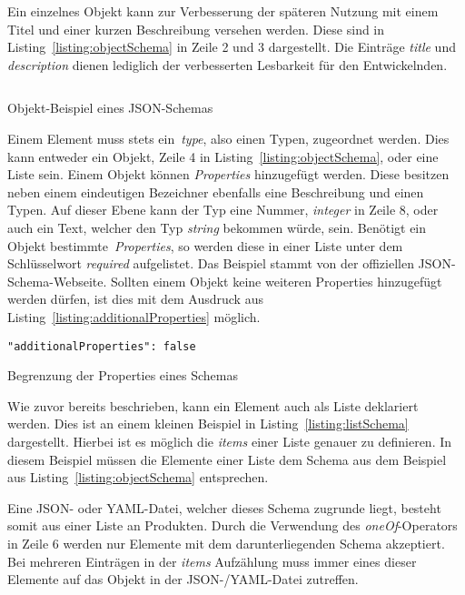 Ein einzelnes Objekt kann zur Verbesserung der späteren Nutzung mit einem Titel und einer kurzen Beschreibung versehen werden.
Diese sind in Listing~\ref{listing:objectSchema} in Zeile 2 und 3 dargestellt.
Die Einträge \textit{title} und \textit{description} dienen lediglich der verbesserten Lesbarkeit für den Entwickelnden.

\begin{listing}[!ht]
    \inputminted{json}{listings/2.2.1/object.schema.json}
    \caption{Objekt-Beispiel eines JSON-Schemas}
    \label{listing:objectSchema}
\end{listing}

Einem Element muss stets ein~\textit{type}, also einen Typen, zugeordnet werden.
Dies kann entweder ein Objekt, Zeile 4 in Listing~\ref{listing:objectSchema}, oder eine Liste sein.
Einem Objekt können \textit{Properties} hinzugefügt werden.
Diese besitzen neben einem eindeutigen Bezeichner ebenfalls eine Beschreibung und einen Typen.
Auf dieser Ebene kann der Typ eine Nummer, \textit{integer} in Zeile 8, oder auch ein Text, welcher den Typ \textit{string} bekommen würde, sein.
Benötigt ein Objekt bestimmte~\textit{Properties}, so werden diese in einer Liste unter dem Schlüsselwort \textit{required} aufgelistet.
Das Beispiel stammt von der offiziellen JSON-Schema-Webseite\cite*{schemaExample}.
Sollten einem Objekt keine weiteren Properties hinzugefügt werden dürfen, ist dies mit dem Ausdruck aus Listing~\ref{listing:additionalProperties} möglich.

\begin{listing}[!ht]
    \begin{verbatim}
"additionalProperties": false
    \end{verbatim}
    \caption{Begrenzung der Properties eines Schemas}
    \label{listing:additionalProperties}
\end{listing}

Wie zuvor bereits beschrieben, kann ein Element auch als Liste deklariert werden.
Dies ist an einem kleinen Beispiel in Listing~\ref{listing:listSchema} dargestellt.
Hierbei ist es möglich die \textit{items} einer Liste genauer zu definieren.
In diesem Beispiel müssen die Elemente einer Liste dem Schema aus dem Beispiel aus Listing~\ref{listing:objectSchema} entsprechen.

Eine JSON- oder YAML-Datei, welcher dieses Schema zugrunde liegt, besteht somit aus einer Liste an Produkten.
Durch die Verwendung des \textit{oneOf}-Operators in Zeile 6 werden nur Elemente mit dem darunterliegenden Schema akzeptiert.
Bei mehreren Einträgen in der \textit{items} Aufzählung muss immer eines dieser Elemente auf das Objekt in der JSON-/YAML-Datei zutreffen.

